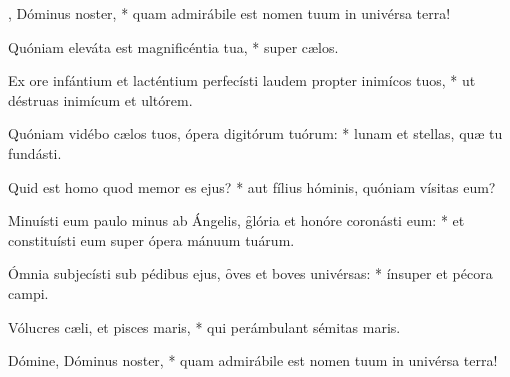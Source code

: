 \begin{psalmus}

    , Dóminus noster, * quam admirábile est nomen tuum in univérsa terra!

    Quóniam eleváta est magnificéntia tua, * super cælos.

    Ex ore infántium et lacténtium perfecísti laudem propter inimícos tuos, * ut déstruas inimícum et ultórem.

    Quóniam vidébo cælos tuos, ópera digitórum tuórum: * lunam et stellas, quæ tu fundásti.

    Quid est homo quod memor es ejus? * aut fílius hóminis, quóniam vísitas eum?

    Minuísti eum paulo minus ab Ángelis, \f glória et honóre coronásti eum: * et constituísti eum super ópera mánuum tuárum.

    Ómnia subjecísti sub pédibus ejus, \f oves et boves univérsas: * ínsuper et pécora campi.

    Vólucres cæli, et pisces maris, * qui perámbulant sémitas maris.

    Dómine, Dóminus noster, * quam admirábile est nomen tuum in univérsa terra!

\end{psalmus}
